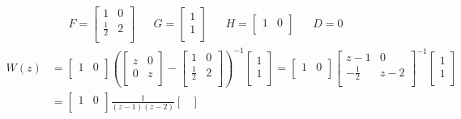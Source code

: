 \begin{exa}
\begin{align*}
    F = \begin{bmatrix}
        1 & 0\\
        \frac{1}{2} & 2\\
    \end{bmatrix}
    &&
    G = \begin{bmatrix}
        1\\
        1\\
    \end{bmatrix}
    &&
    H = \begin{bmatrix}
        1 & 0\\
    \end{bmatrix}
    &&
    D = 0
\end{align*}
\begin{align*}
W(z) &=
\begin{bmatrix}
    1 & 0\\
\end{bmatrix}
\left( \begin{bmatrix}
    z & 0\\
    0 & z\\
\end{bmatrix}
-
\begin{bmatrix}
    1 & 0 \\
    \frac{1}{2} & 2\\
\end{bmatrix}\right)^{-1}
\begin{bmatrix}
    1\\
    1\\
\end{bmatrix}
= \begin{bmatrix}
    1 & 0\\
\end{bmatrix}
\begin{bmatrix}
    z-1 & 0\\
    -\frac{1}{2} & z-2\\
\end{bmatrix}^{-1}
\begin{bmatrix}
    1\\
    1\\
\end{bmatrix}\\
&= \begin{bmatrix}
    1 & 0\\
\end{bmatrix}
\frac{1}{(z-1)(z-2)}
\begin{bmatrix}

\end{bmatrix}
\end{align*}
\end{exa}
